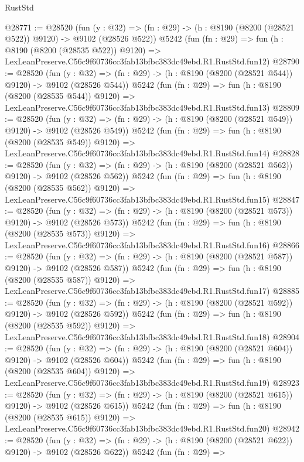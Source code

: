 \begin{lexlean}{RustStd}
\begin{coremodule}
@28771 := @28520
    (fun (y : @32) => (fn : @29) -> (h : @8190 (@8200 (@28521 @522)) @9120) -> @9102 (@28526 @522))
    @5242
    (fun (fn : @29) =>
    fun (h : @8190 (@8200 (@28535 @522)) @9120) =>
    LexLeanPreserve.C56c9f60736cc3fab13bfbc383dc49ebd.R1.RustStd.fun12)
@28790 := @28520
    (fun (y : @32) => (fn : @29) -> (h : @8190 (@8200 (@28521 @544)) @9120) -> @9102 (@28526 @544))
    @5242
    (fun (fn : @29) =>
    fun (h : @8190 (@8200 (@28535 @544)) @9120) =>
    LexLeanPreserve.C56c9f60736cc3fab13bfbc383dc49ebd.R1.RustStd.fun13)
@28809 := @28520
    (fun (y : @32) => (fn : @29) -> (h : @8190 (@8200 (@28521 @549)) @9120) -> @9102 (@28526 @549))
    @5242
    (fun (fn : @29) =>
    fun (h : @8190 (@8200 (@28535 @549)) @9120) =>
    LexLeanPreserve.C56c9f60736cc3fab13bfbc383dc49ebd.R1.RustStd.fun14)
@28828 := @28520
    (fun (y : @32) => (fn : @29) -> (h : @8190 (@8200 (@28521 @562)) @9120) -> @9102 (@28526 @562))
    @5242
    (fun (fn : @29) =>
    fun (h : @8190 (@8200 (@28535 @562)) @9120) =>
    LexLeanPreserve.C56c9f60736cc3fab13bfbc383dc49ebd.R1.RustStd.fun15)
@28847 := @28520
    (fun (y : @32) => (fn : @29) -> (h : @8190 (@8200 (@28521 @573)) @9120) -> @9102 (@28526 @573))
    @5242
    (fun (fn : @29) =>
    fun (h : @8190 (@8200 (@28535 @573)) @9120) =>
    LexLeanPreserve.C56c9f60736cc3fab13bfbc383dc49ebd.R1.RustStd.fun16)
@28866 := @28520
    (fun (y : @32) => (fn : @29) -> (h : @8190 (@8200 (@28521 @587)) @9120) -> @9102 (@28526 @587))
    @5242
    (fun (fn : @29) =>
    fun (h : @8190 (@8200 (@28535 @587)) @9120) =>
    LexLeanPreserve.C56c9f60736cc3fab13bfbc383dc49ebd.R1.RustStd.fun17)
@28885 := @28520
    (fun (y : @32) => (fn : @29) -> (h : @8190 (@8200 (@28521 @592)) @9120) -> @9102 (@28526 @592))
    @5242
    (fun (fn : @29) =>
    fun (h : @8190 (@8200 (@28535 @592)) @9120) =>
    LexLeanPreserve.C56c9f60736cc3fab13bfbc383dc49ebd.R1.RustStd.fun18)
@28904 := @28520
    (fun (y : @32) => (fn : @29) -> (h : @8190 (@8200 (@28521 @604)) @9120) -> @9102 (@28526 @604))
    @5242
    (fun (fn : @29) =>
    fun (h : @8190 (@8200 (@28535 @604)) @9120) =>
    LexLeanPreserve.C56c9f60736cc3fab13bfbc383dc49ebd.R1.RustStd.fun19)
@28923 := @28520
    (fun (y : @32) => (fn : @29) -> (h : @8190 (@8200 (@28521 @615)) @9120) -> @9102 (@28526 @615))
    @5242
    (fun (fn : @29) =>
    fun (h : @8190 (@8200 (@28535 @615)) @9120) =>
    LexLeanPreserve.C56c9f60736cc3fab13bfbc383dc49ebd.R1.RustStd.fun20)
@28942 := @28520
    (fun (y : @32) => (fn : @29) -> (h : @8190 (@8200 (@28521 @622)) @9120) -> @9102 (@28526 @622))
    @5242
    (fun (fn : @29) =>

\end{coremodule}
\end{lexlean}
